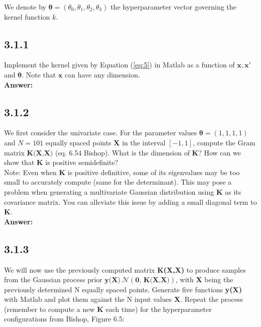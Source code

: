 \documentclass[a4paper]{article}
\begin{document}
We denote by $\boldsymbol{\theta}  = (\theta_0, \theta_1, \theta_2, \theta_3)$ the hyperparameter vector governing the kernel function $k$.

\subsection*{3.1.1}

Implement the kernel given by Equation (\ref{eq:5}) in Matlab as a function of $\textbf{x}, \textbf{x}'$ and $\boldsymbol{\theta}$. Note that $\textbf{x}$ can have any dimension.\\

\textbf{Answer:}\\





\subsection*{3.1.2}

We first consider the univariate case. For the parameter values $\boldsymbol{\theta} = (1,1,1,1)$ and $N = 101$ equally spaced points $\textbf{X}$ in the interval $[-1,1]$, compute the Gram matrix $\textbf{K(X,X)}$ (eq. 6.54 Bishop). What is the dimension of \textbf{K}? How can we show that \textbf{K} is positive semidefinite?\\

Note: Even when \textbf{K} is positive definitive, some of its eigenvalues may be too small to accurately compute (same for the determinant). This may pose a problem when generating a multivariate Gaussian distribution using \textbf{K} as its covariance matrix. You can alleviate this issue by adding a small diagonal term to \textbf{K}.\\


\textbf{Answer:}\\







\subsection*{3.1.3}

We will now use the previously computed matrix \textbf{K(X,X)} to produce samples from the Gaussian process prior $\textbf{y(X)} ~\mathcal{N}(\textbf{0, K(X,X)})$, with \textbf{X} being the previously determined N equally spaced points. Generate five functions \textbf{y(X)} with Matlab and plot them against the N input values \textbf{X}. Repeat the process (remember to compute a new \textbf{K} each time) for the hyperparameter configurations from Bishop, Figure 6.5:
\end{document}
